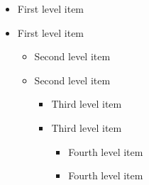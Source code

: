 \documentclass{book}
\renewcommand{\_}{\Texinfounderscore\discretionary{}{}{}}
\begin{document}
\begin{itemize}
   \item First level item
   \item First level item
\begin{itemize}
     \item Second level item
     \item Second level item
\begin{itemize}
       \item Third level item
       \item Third level item
\begin{itemize}
         \item Fourth level item
         \item Fourth level item
\end{itemize}
\end{itemize}
\end{itemize}
\end{itemize}
\end{document}
